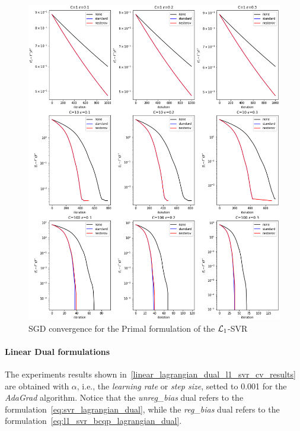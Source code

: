 \begin{figure}[H]
	\centering
	\includegraphics[scale=0.5]{img/l1_svr_loss_history}
	\caption{SGD convergence for the Primal formulation of the $\protect \mathcal{L}_1$-SVR}
	\label{fig:l1_svr_loss_history}
\end{figure}

\pagebreak

\paragraph{Linear Dual formulations}

The experiments results shown in~\ref{linear_lagrangian_dual_l1_svr_cv_results} are obtained with $\alpha$, i.e., the \emph{learning rate} or \emph{step size}, setted to 0.001 for the \emph{AdaGrad} algorithm. Notice that the \emph{unreg\_bias} dual refers to the formulation~\eqref{eq:svr_lagrangian_dual}, while the \emph{reg\_bias} dual refers to the formulation~\eqref{eq:l1_svr_bcqp_lagrangian_dual}.




